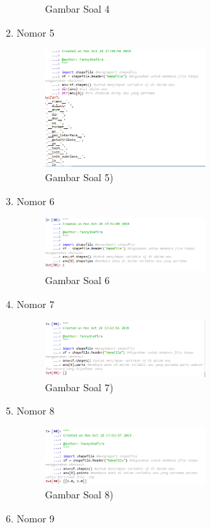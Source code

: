 \begin{enumerate}
\begin{figure}[H]
		\centering
		\caption{Gambar Soal 4}
	\end{figure}
	\item Nomor 5
	
	\begin{figure}[H]
		\includegraphics[width=6cm]{figures/Tugas3/1174069/soal5.png}
		\centering
		\caption{Gambar Soal 5)}
	\end{figure}
	\item Nomor 6
	
	\begin{figure}[H]
		\includegraphics[width=6cm]{figures/Tugas3/1174069/soal6.png}
		\centering
		\caption{Gambar Soal 6}
	\end{figure}
	\item Nomor 7
	
	\begin{figure}[H]
		\includegraphics[width=6cm]{figures/Tugas3/1174069/soal7.png}
		\centering
		\caption{Gambar Soal 7)}
	\end{figure}
	\item Nomor 8
	
	\begin{figure}[H]
		\includegraphics[width=6cm]{figures/Tugas3/1174069/soal8.png}
		\centering
		\caption{Gambar Soal 8)}
	\end{figure}
	\item Nomor 9

\end{enumerate}
